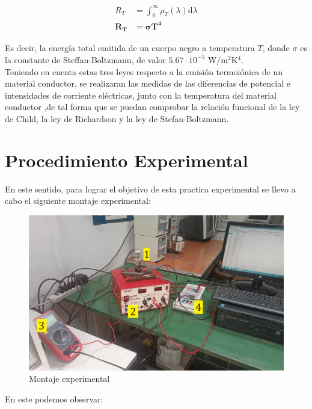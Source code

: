 \documentclass[%
 reprint,
 amsmath,amssymb,
 aps,
]{revtex4-2}
\begin{document}
\begin{align}
    \nonumber
    R_T &= \int_{0}^{\infty} \rho_{T}(\lambda) \mathrm{d}\lambda\\
    \boldsymbol{R_T} &\boldsymbol{= \sigma T^4}
    \label{eq: Ley de Stefan}
\end{align}


\vspace{0.2 cm}
Es decir, la energía total emitida de un cuerpo negro a temperatura $T$, donde $\sigma$ es la constante de Steffan-Boltzmann, de valor $5.67\cdot 10^{-5}$ W/m$^{2}$K$^{4}$.
\\

Teniendo en cuenta estas tres leyes respecto a la emisión termoiónica de un material conductor, se realizaran las medidas de las diferencias de potencial e intensidades de corriente eléctricas, junto con la temperatura del material conductor ,de tal forma que se puedan comprobar la relación funcional de la ley de Child, la ley de Richardson y la ley de Stefan-Boltzmann.

\section{Procedimiento Experimental}
En este sentido, para lograr el objetivo de esta practica experimental se llevo a cabo el siguiente montaje experimental:

\begin{figure}[H]
    \centering
    \includegraphics[width=0.9\linewidth]{../src/imagenes/MontajeEFM2nada.jpg}
    \caption{Montaje experimental}
    \label{montajel}
\end{figure}

En este podemos observar:
\end{document}
